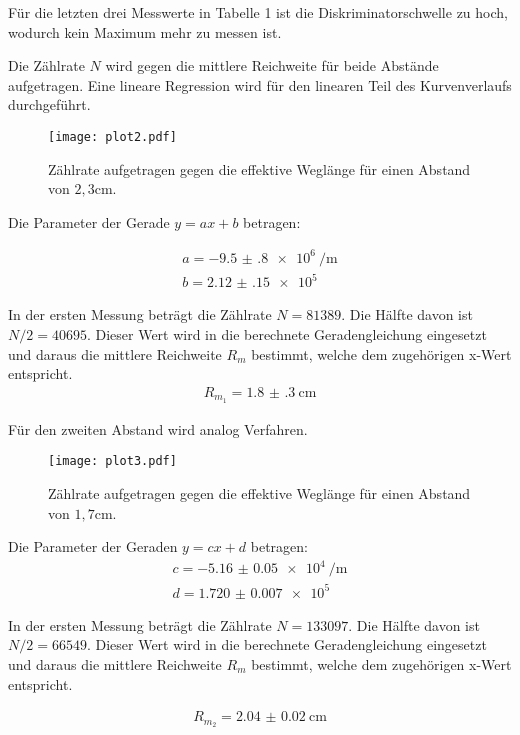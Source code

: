 Für die letzten drei Messwerte in Tabelle 1 ist die Diskriminatorschwelle zu hoch, wodurch kein Maximum mehr zu messen ist.

Die Zählrate $N$ wird gegen die mittlere Reichweite für beide Abstände aufgetragen. Eine lineare Regression wird für den linearen Teil
des Kurvenverlaufs durchgeführt.

\begin{figure}[H]
  \centering
  \texttt{[image: plot2.pdf]}
  \caption{Zählrate aufgetragen gegen die effektive Weglänge für einen Abstand von $2,3$cm.}
  \label{fig:plot}
\end{figure}


Die Parameter der Gerade $y=ax + b$ betragen:

\begin{align*}
  a = \SI{-9.5(8)e6}{\per\meter} \\
  b = \SI{2.12(15)e5}{}
\end{align*}

In der ersten Messung beträgt die Zählrate $N =81389$. Die Hälfte davon ist $N/2 = 40695$. Dieser Wert wird in die berechnete Geradengleichung eingesetzt und
daraus die mittlere Reichweite $R_m$ bestimmt, welche dem zugehörigen x-Wert entspricht.
\begin{align*}
  R_{m_1} = \SI{1.8(3)}{\centi\meter}
\end{align*}


Für den zweiten Abstand wird analog Verfahren.

\begin{figure}[H]
  \centering
  \texttt{[image: plot3.pdf]}
  \caption{Zählrate aufgetragen gegen die effektive Weglänge für einen Abstand von $1,7$cm.}
  \label{fig:plot}
\end{figure}

Die Parameter der Geraden $y = cx+d$ betragen:
\begin{align*}
c = \SI{-5.16(5)e4}{\per\meter} \\
d = \SI{1.720(7)e5}{}
\end{align*}

In der ersten Messung beträgt die Zählrate $N =133097$. Die Hälfte davon ist $N/2 = 66549$. Dieser Wert wird in die berechnete Geradengleichung eingesetzt und
daraus die mittlere Reichweite $R_m$ bestimmt, welche dem zugehörigen x-Wert entspricht.

\begin{align*}
  R_{m_2} = \SI{2.04(2)}{\centi\meter}
\end{align*}

